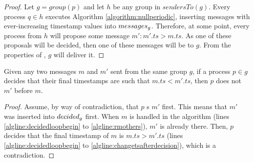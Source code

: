 \documentclass[times, 10pt]{article}
\begin{document}
\begin{proof}Let $g = group(p)$ and let $h$ be any group in $sendersTo(g)$. Every process $q \in h$ executes Algorithm \ref{algorithm:nullperiodic}, inserting messages with ever-increasing timestamp values into $messages\text{$_g$}$. Therefore, at some point, every process from $h$ will propose some message $m' : m'.ts > m.ts$. As one of these proposals will be decided, then one of these messages will be \rmcast{} to $g$. From the properties of \rmcast, $g$ will deliver it.
%
% 
% 
\end{proof}







\begin{lems} \label{lemma:lowertsfrmcastfirst}
Given any two messages $m$ and $m'$ sent from the same group $g$, if a process $p \in g$ decides that their final timestamps are such that $m.ts < m'.ts$, then $p$ does not \rmcast{} $m'$ before $m$.
\end{lems}

\begin{proof}
Assume, by way of contradiction, that $p$ \rmcast{}s $m'$ first. This means that $m'$ was inserted into $decided\text{$_g$}$ first. When $m$ is handled in the algorithm (lines \ref{algline:decidedloopbegin} to \ref{algline:rmothers}), $m'$ is already there. Then, $p$ decides that the final timestamp of $m$ is $m.ts > m'.ts$ (lines \ref{algline:decidedloopbegin} to \ref{algline:changetsafterdecision}), which is a contradiction.
\end{proof}
\end{document}
